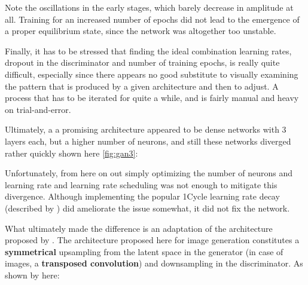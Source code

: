 Note the oscillations in the early stages, which barely decrease in amplitude at all. Training for an increased number of epochs did not lead to the emergence of a proper equilibrium state, since the network was altogether too unstable.

\pagebreak 

Finally, it has to be stressed that finding the ideal combination learning rates, dropout in the discriminator and number of training epochs, is really quite difficult, especially since there appears no good substitute to visually examining the pattern that is produced by a given architecture and then to adjust. A process that has to be iterated for quite a while, and is fairly manual and heavy on trial-and-error.
 
Ultimately, a a promising architecture appeared to be dense networks with 3 layers each, but a higher number of neurons, and still these networks diverged rather quickly shown here \ref{fig:gan3}:
 

Unfortunately, from here on out simply optimizing the number of neurons and learning rate and learning rate scheduling was not enough to mitigate this divergence. Although implementing the popular 1Cycle learning rate decay (described by \cite{smith_1cycle}) did ameliorate the issue somewhat, it did not fix the network.

\pagebreak

What ultimately made the difference is an adaptation of the architecture proposed by \cite{dcgan}. The architecture proposed here for image generation constitutes a \textbf{symmetrical} upsampling from the latent space in the generator (in case of images, a \textbf{transposed convolution}) and downsampling in the discriminator. As shown by \cite{oversampling_gan} here:


